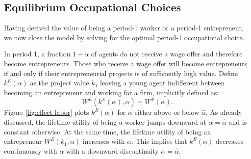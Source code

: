 \documentclass[12pt,american]{paper}
\theoremstyle{remark}
\begin{document}



\subsection{Equilibrium Occupational Choices}

Having derived the value of being a period-1 worker or a period-1 entrepreneur, we now close the model by solving for the optimal period-1 occupational choice.

In period 1, a fraction  $1-\alpha$ of agents do not receive a wage offer and therefore become entrepreneurs. Those who receive a wage offer will become entrepreneurs if and only if their entrepreneurial projects is of sufficiently high value. Define $k^E (\alpha)$ as the project value $k_1$ leaving a young agent indifferent between becoming an entrepreneur and working for a firm, implicitly defined as:
\begin{equation}\label{eq: thresholr project for entrepreneurship}
    W^E(k^E (\alpha) ,\alpha) = W^F (\alpha).
\end{equation}
Figure \ref{fig:effect-labor} plots $k^E (\alpha)$ for  $\alpha$ either above or below $\hat \alpha$. As already discussed, the lifetime utility of being a worker jumps downward at $\alpha=\hat \alpha$ and is constant otherwise. At the same time,  the lifetime utility of being an entrepreneur $W^E(k_1,\alpha)$ increases with $\alpha$.   This implies that $k^E (\alpha)$ decreases continuously with $\alpha$ with a downward discontinuity $\alpha=\hat \alpha$.
\end{document}
